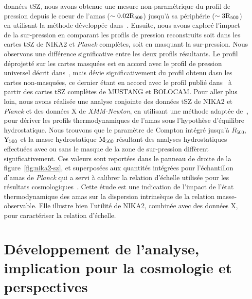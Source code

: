 données tSZ, nous avons obtenue une mesure non-paramétrique du profil
de pression depuis le coeur de l'amas ($\sim 0.02\rm{R}_{500}$)
jusqu'à sa périphérie ($\sim 3\rm{R}_{500}$) en utilisant la méthode
développée dans~\citet{Ruppin2017}. Ensuite, nous avons exploré
l'impact de la sur-pression en comparant les profils de pression
reconstruits soit dans les cartes tSZ de NIKA2 et \emph{Planck}
complètes, soit en masquant la sur-pression. Nous observons une
différence significative entre les deux profils résultants. Le profil
déprojetté sur les cartes masquées est en accord avec le profil de
pression universel décrit dans~\citet{Arnaud2010}, mais dévie
significativement du profil obtenu dasn les cartes non-masquées, ce
dernier étant en accord avec le profil publié dans~\citet{Young2015} à
partir des cartes tSZ complètes de MUSTANG et BOLOCAM. 
Pour aller plus loin, nous avons réalisée une analyse conjointe des
données tSZ de NIKA2 et \emph{Planck} et des données X de
\emph{XMM-Newton}, en utilisant une méthode adaptée
de~\citet{Adam2015}, pour dériver les profils thermodynamiques de
l'amas sous l'hypothèse d'équilibre hydrostatique. Nous trouvons que
le paramètre de Compton intégré jusqu'à $R_{500}$, $\rm{Y}_{500}$ et
la masse hydrostatique $\rm{M}_{500}$ résultant des analyses
hydrostatiques effectuées avec ou sans le masque de la zone de
sur-pression diffèrent significativement. Ces valeurs sont reportées
dans le panneau de droite de la figure~\ref{fig:nika2-sz}, et
superposées aux quantités intégrées pour l'échantillon d'amas de
\emph{Planck} qui a servi à calibrer la relation d'échelle utilisée
pour les résultats
cosmologiques~\citet{Planck_2014_SZ_Cosmo,Planck_2016_SZ_cosmo}. Cette
étude est une indication de l'impact de l'état thermodynamique des
amas sur la dispersion intrinsèque de la relation
masse-observable. Elle illustre bien l'utilité de NIKA2, combinée avec
des données X, pour caractériser la relation d'échelle.   






%
%
%
%
%
%
%
%
\section{Développement de l'analyse, implication pour la cosmologie et perspectives}

